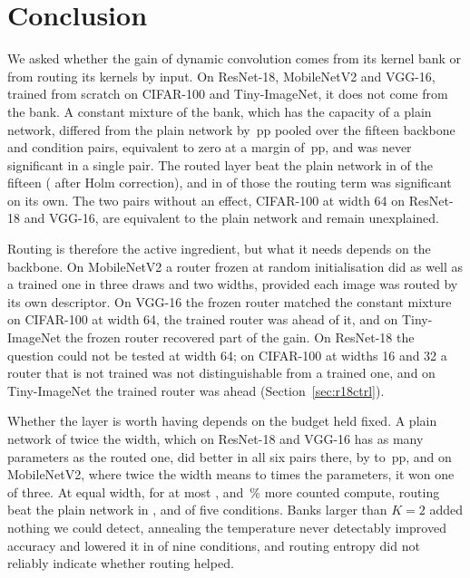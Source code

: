 \documentclass[10pt,a4paper]{article}
\begin{document}
\section{Conclusion}

We asked whether the gain of dynamic convolution comes from its kernel bank
or from routing its kernels by input. On ResNet-18, MobileNetV2 and VGG-16,
trained from scratch on CIFAR-100 and Tiny-ImageNet, it does not come from
the bank. A constant mixture of the bank, which has the capacity of a plain
network, differed from the plain network by \,pp pooled over the
fifteen backbone and condition pairs, equivalent to zero at a margin of
\,pp, and was never significant in a single pair. The
routed layer beat the plain network in  of the fifteen
( after Holm correction), and in  of those the
routing term was significant on its own. The two pairs without an effect,
CIFAR-100 at width 64 on ResNet-18 and VGG-16, are equivalent to the plain
network and remain unexplained.

Routing is therefore the active ingredient, but what it needs depends on the
backbone. On MobileNetV2 a router frozen at random initialisation did as well
as a trained one in three draws and two widths, provided each image was
routed by its own descriptor. On VGG-16 the frozen router matched the constant
mixture on CIFAR-100 at width 64, the trained router was ahead of it, and on
Tiny-ImageNet the frozen router recovered part of the gain. On ResNet-18 the
question could not be tested at width 64; on CIFAR-100 at widths 16 and 32 a
router that is not trained was not distinguishable from a trained one, and on
Tiny-ImageNet the trained router was ahead (Section~\ref{sec:r18ctrl}).

Whether the layer is worth having depends on the budget held fixed. A plain
network of twice the width, which on ResNet-18 and VGG-16 has as many
parameters as the routed one, did better in all six pairs there, by
 to \,pp, and on MobileNetV2, where twice the width means
 to  times the parameters, it won one of three. At
equal width, for at most ,  and
\,\% more counted compute, routing beat the plain network in
,  and  of five conditions. Banks larger
than $K=2$ added nothing we could detect, annealing the temperature never
detectably improved accuracy and lowered it in  of nine
conditions, and routing entropy did not reliably indicate whether routing
helped.
\end{document}
